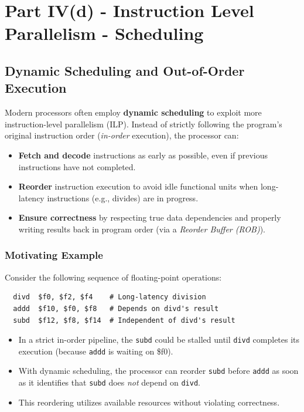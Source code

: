 \chapter{Part IV(d) - Instruction Level Parallelism - Scheduling}
\section{Dynamic Scheduling and Out-of-Order Execution}
\label{sec:dynsched}

Modern processors often employ \textbf{dynamic scheduling} to exploit more instruction-level parallelism
(ILP). Instead of strictly following the program’s original instruction order
(\emph{in-order} execution), the processor can:

\begin{itemize}
  \item \textbf{Fetch and decode} instructions as early as possible, even if previous
        instructions have not completed.
  \item \textbf{Reorder} instruction execution to avoid idle functional units when
        long-latency instructions (e.g., divides) are in progress.
  \item \textbf{Ensure correctness} by respecting true data dependencies and properly
        writing results back in program order (via a \emph{Reorder Buffer (ROB)}).
\end{itemize}

\subsection{Motivating Example}
Consider the following sequence of floating-point operations:
\begin{verbatim}
  divd  $f0, $f2, $f4    # Long-latency division
  addd  $f10, $f0, $f8   # Depends on divd's result
  subd  $f12, $f8, $f14  # Independent of divd's result
\end{verbatim}

\begin{itemize}
  \item In a strict in-order pipeline, the \texttt{subd} could be stalled until
        \texttt{divd} completes its execution (because \texttt{addd} is waiting
        on \$f0).
  \item With dynamic scheduling, the processor can reorder
        \texttt{subd} before \texttt{addd} as soon as it identifies that
        \texttt{subd} does \emph{not} depend on \texttt{divd}.
  \item This reordering utilizes available resources without violating correctness.
\end{itemize}

